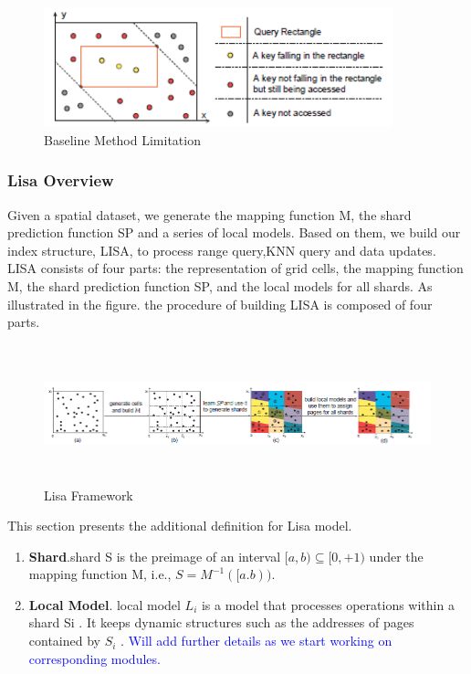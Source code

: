 \begin{figure}[t]
    \centering
    \includegraphics[width=0.9\textwidth]{graphs/Lisa_Baseline_Model_Limitation.png}
    \caption{Baseline Method Limitation }
    \label{fig:BaseLine_Method_Limitation}
\end{figure}

\subsubsection{Lisa Overview}
Given a spatial dataset, we generate the mapping function
M, the shard prediction function SP and a series of local
models. Based on them, we build our index structure, LISA, to
process range query,KNN query and data updates. LISA consists of four parts: the representation of grid cells, the mapping function M, the shard prediction function SP, and the local models for all shards. As illustrated in the figure. the procedure of building LISA is composed of four parts.

\begin{figure}[t]
    \centering
    \includegraphics[width=17cm,height=4cm]{graphs/Lisa_Overview.png}
    \caption{Lisa Framework }
    \label{fig:Lisa_Framework}
\end{figure}

This section presents the additional definition for Lisa model.  

\begin{enumerate}
	\item \textbf{Shard}.shard S is the preimage of an
interval $[a, b) \subseteq [0, +1)$ under the mapping function M,  i.e., $S = M^{-1}([a.b))$.
    
	\item \textbf{Local Model}. local model $L_{i}$ is a model
that processes operations within a shard Si . It keeps dynamic
structures such as the addresses of pages contained by $S_{i}$ .
\textcolor{blue} {Will add further details as we start working on corresponding modules.}	
\end{enumerate}


